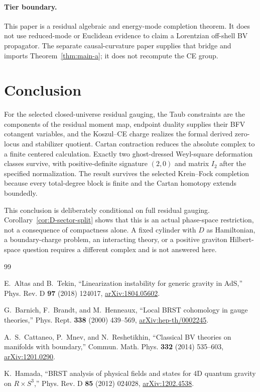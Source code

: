\documentclass[11pt]{article}
\theoremstyle{remark}
\begin{document}
\paragraph{Tier boundary.}
This paper is a residual algebraic and energy-mode completion theorem.  It
does not use reduced-mode or Euclidean evidence to claim a Lorentzian
off-shell BV propagator.  The separate causal-curvature paper supplies that
bridge and imports Theorem~\ref{thm:main-a}; it does not recompute the CE
group.

\section{Conclusion}

For the selected closed-universe residual gauging, the Taub constraints are
the components of the residual moment map, endpoint duality supplies their
BFV cotangent variables, and the Koszul--CE charge realizes the formal
derived zero-locus and stabilizer quotient.  Cartan contraction reduces the
absolute complex to a finite centered calculation.  Exactly two
ghost-dressed Weyl-square deformation classes survive, with positive-definite
signature $(2,0)$ and matrix $I_2$ after the specified normalization.  The
result survives the selected Krein--Fock completion because every
total-degree block is finite and the Cartan homotopy extends boundedly.

This conclusion is deliberately conditional on full residual gauging.
Corollary~\ref{cor:D-sector-split} shows that this is an actual phase-space
restriction, not a consequence of compactness alone.  A fixed cylinder with
$D$ as Hamiltonian, a boundary-charge problem, an interacting theory, or a
positive graviton Hilbert-space question requires a different complex and is
not answered here.

\begin{thebibliography}{99}

E.~Altas and B.~Tekin,
``Linearization instability for generic gravity in AdS,''
Phys. Rev. D \textbf{97} (2018) 124017,
\href{https://arxiv.org/abs/1804.05602}{arXiv:1804.05602}.

G.~Barnich, F.~Brandt, and M.~Henneaux,
``Local BRST cohomology in gauge theories,''
Phys. Rept. \textbf{338} (2000) 439--569,
\href{https://arxiv.org/abs/hep-th/0002245}{arXiv:hep-th/0002245}.

A.~S.~Cattaneo, P.~Mnev, and N.~Reshetikhin,
``Classical BV theories on manifolds with boundary,''
Commun. Math. Phys. \textbf{332} (2014) 535--603,
\href{https://arxiv.org/abs/1201.0290}{arXiv:1201.0290}.

K.~Hamada,
``BRST analysis of physical fields and states for 4D quantum gravity on
$R\times S^3$,''
Phys. Rev. D \textbf{85} (2012) 024028,
\href{https://arxiv.org/abs/1202.4538}{arXiv:1202.4538}.

\end{thebibliography}
\end{document}
